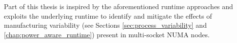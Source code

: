 Part of this thesis is inspired by the aforementioned runtime approaches and
exploits the underlying runtime to identify and mitigate the effects of
manufacturing variability (see Sections \ref{sec:process_variability} and
\ref{chap:power_aware_runtime}) present in multi-socket NUMA nodes.


